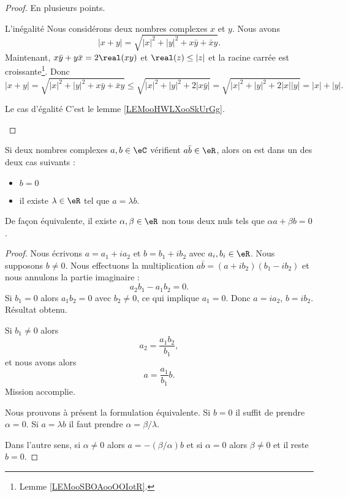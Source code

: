 \begin{proof}
	En plusieurs points.
	\begin{subproof}
		\item[L'inégalité]
		Nous considérons deux nombres complexes \( x\) et \( y\). Nous avons
		\begin{equation}
			| x+y |=\sqrt{ | x |^2+| y |^2+x\bar y+\bar xy }.
		\end{equation}
		Maintenant, \( x\bar y+y\bar x=2\real(xy)\) et \( \real(z)\leq | z |\) et la racine carrée est croissante\footnote{Lemme \ref{LEMooSBOAooOOIotR}.}. Donc
		\begin{equation}
			| x+y |=\sqrt{ | x |^2+| y |^2+x\bar y+\bar xy }\leq \sqrt{ | x |^2+| y |^2+2| x\bar y | }=\sqrt{ | x |^2+| y |^2+2| x | |y | }=| x |+| y |.
		\end{equation}
		\item[Le cas d'égalité]
		C'est le lemme \ref{LEMooHWLXooSkUrGg}.
	\end{subproof}
\end{proof}

\begin{lemma}       \label{LEMooXJBJooFDmhnV}
	Si deux nombres complexes \( a,b\in \eC\) vérifient \( a\bar b\in \eR\), alors on est dans un des deux cas suivants :
	\begin{itemize}
		\item \( b=0\)
		\item il existe \( \lambda\in \eR\) tel que \( a=\lambda b\).
	\end{itemize}
	De façon équivalente, il existe \( \alpha,\beta\in \eR\) non tous deux nuls tels que \( \alpha a+\beta b=0\).
\end{lemma}

\begin{proof}
	Nous écrivons \( a=a_1+ia_2\) et \( b=b_1+ib_2\) avec \( a_i,b_i\in \eR\). Nous supposons \( b\neq 0\). Nous effectuons la multiplication \( a\bar b=(a+ib_2)(b_1-ib_2)\) et nous annulons la partie imaginaire :
	\begin{equation}
		a_2b_1-a_1b_2=0.
	\end{equation}
	Si \( b_1=0\) alors \( a_1b_2=0\) avec \( b_2\neq 0\), ce qui implique \( a_1=0\). Donc \( a=ia_2\), \( b=ib_2\). Résultat obtenu.

	Si \( b_1\neq 0\) alors
	\begin{equation}
		a_2=\frac{ a_1b_2 }{ b_1 },
	\end{equation}
	et nous avons alors
	\begin{equation}
		a=\frac{ a_1 }{ b_1 }b.
	\end{equation}
	Mission accomplie.

	Nous prouvons à présent la formulation équivalente. Si \( b=0\) il suffit de prendre \( \alpha=0\). Si \( a=\lambda b\) il faut prendre \( \alpha=\beta/\lambda\).

	Dans l'autre sens, si \( \alpha\neq 0\) alors \( a=-(\beta/\alpha)b\) et si \( \alpha=0\) alors \( \beta\neq 0\) et il reste \( b=0\).
\end{proof}

